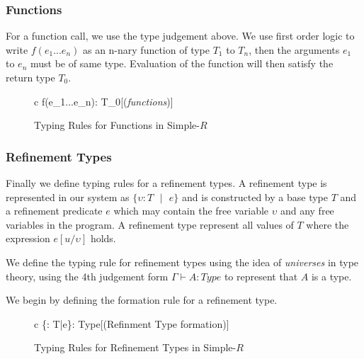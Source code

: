 \documentclass[a4paper,12pt]{report}
\begin{document}
\subsubsection{Functions}
For a function call, we use the type judgement above. We use  
first order logic to write $f(e_1...e_n)$ as an n-nary function of 
type $T_1$ to $T_n$, then the arguments $e_1$ to $e_n$ must be of same type. 
Evaluation of the function will then satisfy the return type $T_0$.

\begin{figure}[H]
  \begin{center}
    \begin{tabular} {c}
        {\Gamma \vdash f(e_1...e_n): T_0}[(\textit{functions})]
    \end{tabular}
  \end{center}
  \caption{Typing Rules for Functions in Simple-$R$}
\end{figure}

\subsubsection{Refinement Types}
Finally we define typing rules for a refinement types. A refinement type 
is represented in our system as $\{\upsilon : T\text{ }|\text{ }e\}$ and is 
constructed by a base type $T$ and a refinement predicate $e$ which may contain 
the free variable $\upsilon$ and any free variables in the program. A refinement 
type represent all values of $T$ where the expression $e[u/\upsilon]$ holds. 

\par
We define the typing rule for refinement types using the idea of 
\textit{universes} \cite{martinLof} in type theory, using the 4th judgement form 
$\Gamma \vdash A : Type$ to represent that $A$ is a type. 

\par
We begin by defining the formation rule for a refinement type. 
\begin{figure}[H]
  \begin{center}
    \begin{tabular} {c}
        {\Gamma \vdash \{\upsilon : T\text{ }|\text{ }e\}: Type}[(Refinment Type formation)]
    \end{tabular}
  \end{center}
  \caption{Typing Rules for Refinement Types in Simple-$R$}
\end{figure}
\end{document}
